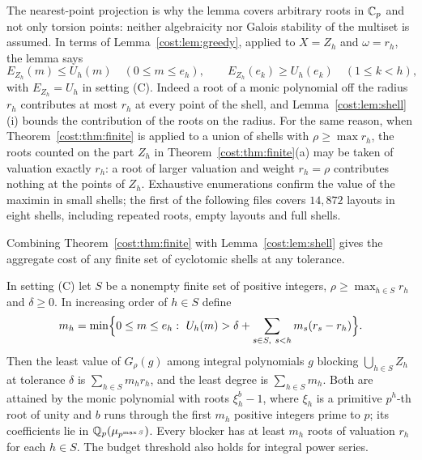 The nearest-point projection is why the lemma covers arbitrary roots in $\mathbb{C}_p$ and not only
torsion points: neither algebraicity nor Galois stability of the multiset is assumed. In
terms of Lemma~\ref{cost:lem:greedy}, applied to $X=Z_h$ and $\omega=r_h$, the lemma says
\begin{equation}\label{cost:eq:EU}
 E_{Z_h}(m)\le U_h(m)\quad(0\le m\le e_h),\qquad
 E_{Z_h}(e_k)\ge U_h(e_k)\quad(1\le k<h),
\end{equation}
with $E_{Z_h}=U_h$ in setting \textup{(C)}. Indeed a root of a monic polynomial off the
radius $r_h$ contributes at most $r_h$ at every point of the shell, and
Lemma~\ref{cost:lem:shell}(i) bounds the contribution of the roots on the radius. For the same
reason, when Theorem~\ref{cost:thm:finite} is applied to a union of shells with
$\rho\ge\max r_h$, the roots counted on the part $Z_h$ in
Theorem~\ref{cost:thm:finite}(a) may be taken of valuation exactly $r_h$: a root of larger
valuation and weight $r_h=\rho$ contributes nothing at the points of $Z_h$. Exhaustive
enumerations confirm the value of the maximin in small shells; the first of the following
files covers $14{,}872$ layouts in eight shells, including repeated roots, empty layouts
and full shells.

Combining Theorem~\ref{cost:thm:finite} with Lemma~\ref{cost:lem:shell} gives the aggregate cost of any
finite set of cyclotomic shells at any tolerance.

\begin{corollary}\label{cost:cor:shells}
In setting \textup{(C)} let $S$ be a nonempty finite set of positive integers,
$\rho\ge\max_{h\in S}r_h$ and $\delta\ge0$. In increasing order of $h\in S$ define
\begin{equation}\label{cost:eq:shellrec}
 m_h=\min\Bigl\{0\le m\le e_h:\ U_h(m)>\delta+\sum_{s\in S,\ s<h}m_s(r_s-r_h)\Bigr\}.
\end{equation}
Then the least value of $G_\rho(g)$ among integral polynomials $g$ blocking
$\bigcup_{h\in S}Z_h$ at tolerance $\delta$ is $\sum_{h\in S}m_hr_h$, and the least degree is
$\sum_{h\in S}m_h$. Both are attained by the monic polynomial with roots $\xi_h^b-1$, where
$\xi_h$ is a primitive $p^h$-th root of unity and $b$ runs through the first $m_h$ positive
integers prime to $p$; its coefficients lie in $\mathbb{Q}_p(\mu_{p^{\max S}})$. Every blocker has at
least $m_h$ roots of valuation $r_h$ for each $h\in S$. The budget threshold also holds for
integral power series.
\end{corollary}

